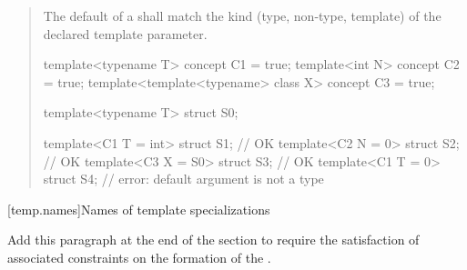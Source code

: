 \begin{quote}
\begin{addedblock}
\setcounter{Paras}{11}
\pnum
The default  of
a  shall match
the kind (type, non-type, template) of the declared template parameter.
% 
\enterexample
\begin{codeblock}
template<typename T> concept C1 = true;
template<int N> concept C2 = true;
template<template<typename> class X> concept C3 = true;

template<typename T> struct S0;

template<C1 T = int> struct S1; // OK
template<C2 N = 0> struct S2;   // OK
template<C3 X = S0> struct S3;  // OK
template<C1 T = 0> struct S4;   // error: default argument is not a type
\end{codeblock}
\exitexample
\end{addedblock}
\end{quote}


[temp.names]{Names of template specializations}

Add this paragraph at the end of the section to require the satisfaction of 
associated constraints on the formation of the .

